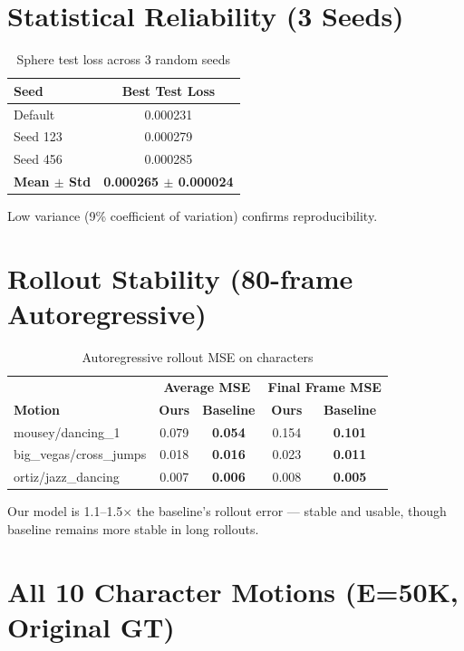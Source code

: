 \documentclass[10pt]{article}
\begin{document}
\section{Statistical Reliability (3 Seeds)}

\begin{table}[h]
\centering
\caption{Sphere test loss across 3 random seeds}
\begin{tabular}{lc}
\toprule
\textbf{Seed} & \textbf{Best Test Loss} \\
\midrule
Default & 0.000231 \\
Seed 123 & 0.000279 \\
Seed 456 & 0.000285 \\
\midrule
\textbf{Mean $\pm$ Std} & \textbf{0.000265 $\pm$ 0.000024} \\
\bottomrule
\end{tabular}
\end{table}

Low variance (9\% coefficient of variation) confirms reproducibility.

\section{Rollout Stability (80-frame Autoregressive)}

\begin{table}[h]
\centering
\caption{Autoregressive rollout MSE on characters}
\begin{tabular}{l|cc|cc}
\toprule
& \multicolumn{2}{c|}{\textbf{Average MSE}} & \multicolumn{2}{c}{\textbf{Final Frame MSE}} \\
\textbf{Motion} & \textbf{Ours} & \textbf{Baseline} & \textbf{Ours} & \textbf{Baseline} \\
\midrule
mousey/dancing\_1 & 0.079 & \textbf{0.054} & 0.154 & \textbf{0.101} \\
big\_vegas/cross\_jumps & 0.018 & \textbf{0.016} & 0.023 & \textbf{0.011} \\
ortiz/jazz\_dancing & 0.007 & \textbf{0.006} & 0.008 & \textbf{0.005} \\
\bottomrule
\end{tabular}
\end{table}

Our model is 1.1--1.5$\times$ the baseline's rollout error --- stable and usable, though baseline remains more stable in long rollouts.

\section{All 10 Character Motions (E=50K, Original GT)}
\end{document}
